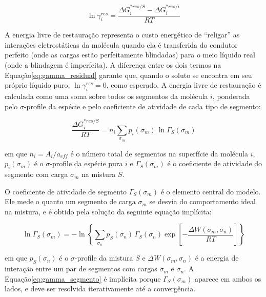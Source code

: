 \begin{equation}
    \ln \gamma_i^{res} =
    \frac{\Delta G_i^{*res/S} - \Delta G_i^{*res/i}}{RT}
    \label{eq:gamma_residual}
\end{equation}

A energia livre de restauração representa o custo energético de ``religar'' as interações eletrostáticas da molécula quando ela é transferida do condutor perfeito (onde as cargas estão perfeitamente blindadas) para o meio líquido real (onde a blindagem é imperfeita)\cite{lin2002}. A diferença entre os dois termos na Equação\ref{eq:gamma_residual} garante que, quando o soluto se encontra em seu próprio líquido puro, $\ln \gamma_i^{res} = 0$, como esperado. A energia livre de restauração é calculada como uma soma sobre todos os segmentos da molécula $i$, ponderada pelo $\sigma$-profile da espécie e pelo coeficiente de atividade de cada tipo de segmento\cite{lin2002}:

\begin{equation}
    \frac{\Delta G_i^{*res/S}}{RT} =
    n_i \sum_{\sigma_m} p_i(\sigma_m) \, \ln \Gamma_S(\sigma_m)
    \label{eq:energia_restauracao}
\end{equation}

\noindent em que $n_i = A_i / a_{eff}$ é o número total de segmentos na superfície da molécula $i$, $p_i(\sigma_m)$ é o $\sigma$-profile da espécie pura $i$ e $\Gamma_S(\sigma_m)$ é o coeficiente de atividade do segmento com carga $\sigma_m$ na mistura $S$.

O coeficiente de atividade de segmento $\Gamma_S(\sigma_m)$ é o elemento central do modelo. Ele mede o quanto um segmento de carga $\sigma_m$ se desvia do comportamento ideal na mistura, e é obtido pela solução da seguinte equação implícita\cite{lin2002}:

\begin{equation}
    \ln \Gamma_S(\sigma_m) =
    -\ln \left\{
        \sum_{\sigma_n} p_S(\sigma_n) \, \Gamma_S(\sigma_n)
        \exp \left[
            -\frac{\Delta W(\sigma_m, \sigma_n)}{RT}
        \right]
    \right\}
    \label{eq:gamma_segmento}
\end{equation}

\noindent em que $p_S(\sigma_n)$ é o $\sigma$-profile da mistura $S$ e $\Delta W(\sigma_m, \sigma_n)$ é a energia de interação entre um par de segmentos com cargas $\sigma_m$ e $\sigma_n$. A Equação\ref{eq:gamma_segmento} é implícita porque $\Gamma_S(\sigma_m)$
aparece em ambos os lados, e deve ser resolvida iterativamente até a convergência\cite{lin2002}.

